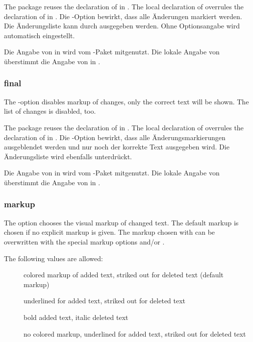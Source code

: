 The  package reuses the declaration of  in .
The local declaration of  overrules the declaration of  in .
\fi
\ifGERMAN
	Die -Option bewirkt, dass alle Änderungen markiert werden.
	Die Änderungsliste kann durch  ausgegeben werden.
	Ohne Optionsangabe wird  automatisch eingestellt.

	Die Angabe von  in  wird vom -Paket mitgenutzt.
	Die lokale Angabe von  überstimmt die Angabe von  in .
\fi


\subsubsection{final}
\ifENGLISH
The -option disables markup of changes, only the correct text will be shown.
The list of changes is disabled, too.

The  package reuses the declaration of  in .
The local declaration of  overrules the declaration of  in .
\fi
\ifGERMAN
	Die -Option bewirkt, dass alle Änderungsmarkierungen ausgeblendet werden und nur noch der korrekte Text ausgegeben wird.
	Die Änderungsliste wird ebenfalls unterdrückt.

	Die Angabe von  in  wird vom -Paket mitgenutzt.
	Die lokale Angabe von  überstimmt die Angabe von  in .
\fi


\subsubsection{markup}
\ifENGLISH
The  option chooses the visual markup of changed text.
The default markup is chosen if no explicit markup is given.
The markup chosen with  can be overwritten with the special markup options  and/or .

The following values are allowed:
\begin{description}
	\item [] colored markup of added text, striked out for deleted text (default markup)
	\item [] underlined for added text, striked out for deleted text
	\item [] bold added text, italic deleted text
	\item [] no colored markup, underlined for added text, striked out for deleted text
\end{description}


